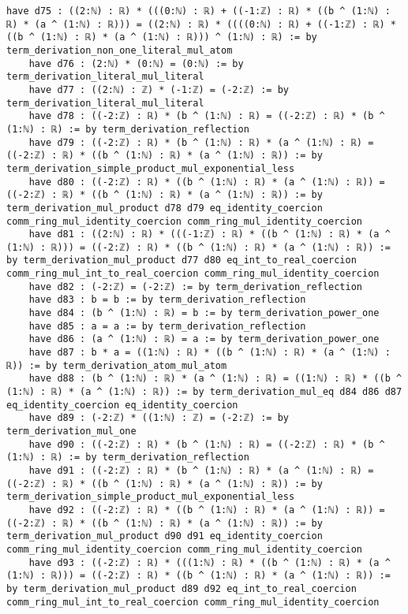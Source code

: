 \documentclass{article}
\begin{document}
\begin{tcolorbox}[colback=white!10, width=\linewidth]
\begin{lstlisting}[language=Lean4]
    have d75 : ((2:ℕ) : ℝ) * (((0:ℕ) : ℝ) + ((-1:ℤ) : ℝ) * ((b ^ (1:ℕ) : ℝ) * (a ^ (1:ℕ) : ℝ))) = ((2:ℕ) : ℝ) * ((((0:ℕ) : ℝ) + ((-1:ℤ) : ℝ) * ((b ^ (1:ℕ) : ℝ) * (a ^ (1:ℕ) : ℝ))) ^ (1:ℕ) : ℝ) := by term_derivation_non_one_literal_mul_atom
    have d76 : (2:ℕ) * (0:ℕ) = (0:ℕ) := by term_derivation_literal_mul_literal
    have d77 : ((2:ℕ) : ℤ) * (-1:ℤ) = (-2:ℤ) := by term_derivation_literal_mul_literal
    have d78 : ((-2:ℤ) : ℝ) * (b ^ (1:ℕ) : ℝ) = ((-2:ℤ) : ℝ) * (b ^ (1:ℕ) : ℝ) := by term_derivation_reflection
    have d79 : ((-2:ℤ) : ℝ) * (b ^ (1:ℕ) : ℝ) * (a ^ (1:ℕ) : ℝ) = ((-2:ℤ) : ℝ) * ((b ^ (1:ℕ) : ℝ) * (a ^ (1:ℕ) : ℝ)) := by term_derivation_simple_product_mul_exponential_less
    have d80 : ((-2:ℤ) : ℝ) * ((b ^ (1:ℕ) : ℝ) * (a ^ (1:ℕ) : ℝ)) = ((-2:ℤ) : ℝ) * ((b ^ (1:ℕ) : ℝ) * (a ^ (1:ℕ) : ℝ)) := by term_derivation_mul_product d78 d79 eq_identity_coercion comm_ring_mul_identity_coercion comm_ring_mul_identity_coercion
    have d81 : ((2:ℕ) : ℝ) * (((-1:ℤ) : ℝ) * ((b ^ (1:ℕ) : ℝ) * (a ^ (1:ℕ) : ℝ))) = ((-2:ℤ) : ℝ) * ((b ^ (1:ℕ) : ℝ) * (a ^ (1:ℕ) : ℝ)) := by term_derivation_mul_product d77 d80 eq_int_to_real_coercion comm_ring_mul_int_to_real_coercion comm_ring_mul_identity_coercion
    have d82 : (-2:ℤ) = (-2:ℤ) := by term_derivation_reflection
    have d83 : b = b := by term_derivation_reflection
    have d84 : (b ^ (1:ℕ) : ℝ) = b := by term_derivation_power_one
    have d85 : a = a := by term_derivation_reflection
    have d86 : (a ^ (1:ℕ) : ℝ) = a := by term_derivation_power_one
    have d87 : b * a = ((1:ℕ) : ℝ) * ((b ^ (1:ℕ) : ℝ) * (a ^ (1:ℕ) : ℝ)) := by term_derivation_atom_mul_atom
    have d88 : (b ^ (1:ℕ) : ℝ) * (a ^ (1:ℕ) : ℝ) = ((1:ℕ) : ℝ) * ((b ^ (1:ℕ) : ℝ) * (a ^ (1:ℕ) : ℝ)) := by term_derivation_mul_eq d84 d86 d87 eq_identity_coercion eq_identity_coercion
    have d89 : (-2:ℤ) * ((1:ℕ) : ℤ) = (-2:ℤ) := by term_derivation_mul_one
    have d90 : ((-2:ℤ) : ℝ) * (b ^ (1:ℕ) : ℝ) = ((-2:ℤ) : ℝ) * (b ^ (1:ℕ) : ℝ) := by term_derivation_reflection
    have d91 : ((-2:ℤ) : ℝ) * (b ^ (1:ℕ) : ℝ) * (a ^ (1:ℕ) : ℝ) = ((-2:ℤ) : ℝ) * ((b ^ (1:ℕ) : ℝ) * (a ^ (1:ℕ) : ℝ)) := by term_derivation_simple_product_mul_exponential_less
    have d92 : ((-2:ℤ) : ℝ) * ((b ^ (1:ℕ) : ℝ) * (a ^ (1:ℕ) : ℝ)) = ((-2:ℤ) : ℝ) * ((b ^ (1:ℕ) : ℝ) * (a ^ (1:ℕ) : ℝ)) := by term_derivation_mul_product d90 d91 eq_identity_coercion comm_ring_mul_identity_coercion comm_ring_mul_identity_coercion
    have d93 : ((-2:ℤ) : ℝ) * (((1:ℕ) : ℝ) * ((b ^ (1:ℕ) : ℝ) * (a ^ (1:ℕ) : ℝ))) = ((-2:ℤ) : ℝ) * ((b ^ (1:ℕ) : ℝ) * (a ^ (1:ℕ) : ℝ)) := by term_derivation_mul_product d89 d92 eq_int_to_real_coercion comm_ring_mul_int_to_real_coercion comm_ring_mul_identity_coercion

\end{lstlisting}
\end{tcolorbox}
\end{document}
